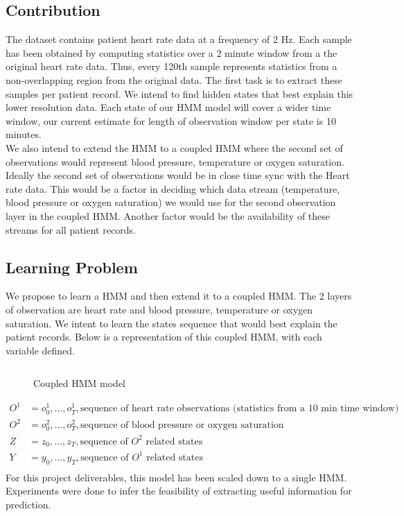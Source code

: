 \documentclass[12pt,solutions]{article}
\begin{document}
\subsection{Contribution}
The dataset contains patient heart rate data at a frequency of 2 Hz. Each sample has been obtained by computing statistics over a 2 minute window from a the original heart rate data. Thus, every 120th sample represents statistics from a non-overlapping region from the original data. The first task is to extract these samples per patient record. We intend to find hidden states that best explain this lower resolution data. Each state of our HMM model will cover a wider time window, our current estimate for length of observation window per state is 10 minutes.\\
We also intend to extend the HMM to a coupled HMM where the second set of observations would represent blood pressure, temperature or oxygen saturation. Ideally the second set of observations would be in close time sync with the Heart rate data. This would be a factor in deciding which data stream (temperature, blood pressure or oxygen saturation) we would use for the second observation layer in the coupled HMM. Another factor would be the availability of these streams for all patient records. \\
\subsection{Learning Problem}
We propose to learn a HMM and then extend it to a coupled HMM. The 2 layers of observation are heart rate and blood pressure, temperature or oxygen saturation.  We intent to learn the states sequence that would best explain the patient records. Below is a representation of this coupled HMM, with each variable defined.\\
\begin{figure}[ht]
  \begin{center}
    \begin{tabular}{cc}
      
    \end{tabular}
  \end{center}
  \caption{Coupled HMM model}
\label{fig:coupled_hmm_fig}
\end{figure}
\begin{align*}
O^1 &= o^1_{0}, \ldots,o^1_{T},   \text{sequence of heart rate observations (statistics from a 10 min time window)}\\
O^2 &=o^2_{0}, \ldots,o^2_{T},  \text{sequence of blood pressure or oxygen saturation}\\
Z &=  z_{0}, \ldots,z_{T}, \text{sequence of ${O^2}$ related states}\\
Y &=  y_{0}, \ldots,y_{T},  \text{sequence of ${O^1}$ related states}\\
\end{align*}
For this project deliverables, this model has been scaled down to a single HMM. Experiments were done to infer the feasibility of extracting useful information for prediction.\\
\end{document}
